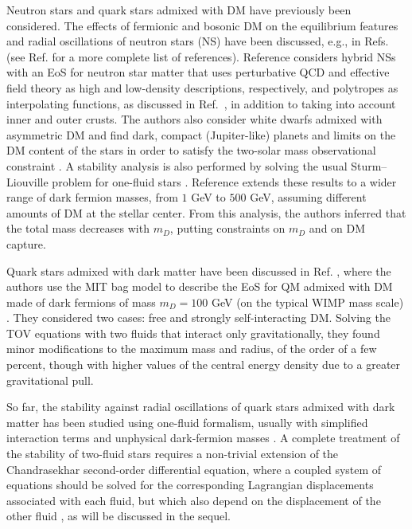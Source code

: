 \documentclass[universe,article,accept,moreauthors,pdftex]{Definitions/mdpi}
\begin{document}
Neutron stars and quark stars admixed with DM have  previously been considered. The effects of fermionic and bosonic DM on the equilibrium features and radial oscillations of neutron stars (NS) have been discussed, e.g., in Refs. \cite{Ciarcelluti:2010ji,Leung:2011zz,Leung:2012vea,Li:2012ii,Xiang:2013xwa,Ellis:2018bkr,Karkevandi:2021ygv} (see Ref. \cite{DelPopolo:2020hel} for a more complete list of references). Reference \cite{Tolos:2015qra} considers hybrid NSs with an EoS for neutron star matter that uses perturbative QCD and effective field theory as high and low-density descriptions, respectively, and polytropes as interpolating functions, as discussed in Ref.~\cite{Kurkela:2014vha}, in addition to taking into account inner and outer crusts. The authors also consider white dwarfs admixed with asymmetric DM and find dark, compact (Jupiter-like) planets and limits on the DM content of the stars in order to satisfy the two-solar mass observational constraint \cite{Demorest:2010bx,Antoniadis:2013pzd}. A stability analysis is also performed by solving the usual Sturm--Liouville problem for one-fluid stars \citep{Chandrasekhar:1964zza,Shapiro:1983du}. Reference \cite{Deliyergiyev:2019vti} extends these results to a wider range of dark fermion masses, from $1$ GeV to $500$ GeV,  assuming different amounts of DM at the stellar center. From this analysis, the authors inferred that the total mass decreases with $m_D$, putting constraints on $m_D$ and on DM capture. 

Quark stars admixed with dark matter have been discussed in Ref. \cite{Mukhopadhyay:2015xhs}, where the authors use the MIT bag model to describe the EoS for QM admixed with DM made of dark fermions of mass $m_D=100$ GeV (on the typical WIMP mass scale) %
. They considered two cases: free and strongly self-interacting DM. Solving the TOV equations with two fluids that interact only gravitationally, they found minor modifications to the maximum mass and radius, of the order of a few percent, though with higher values of the central energy density due to a greater gravitational pull. 

So far, the stability against radial oscillations of quark stars admixed with dark matter has been studied using one-fluid formalism, usually with simplified interaction terms and unphysical dark-fermion masses  \cite{Panotopoulos:2017eig,Panotopoulos:2018ipq}. A complete treatment of the stability of two-fluid stars requires a non-trivial extension of the Chandrasekhar second-order differential equation, where a coupled system of equations should be solved for the corresponding Lagrangian displacements associated with each fluid, but which also depend on the displacement of the other  fluid %
\cite{Leung:2011zz,Leung:2012vea,Kain:2020zjs,Kain:2021hpk}, as will be discussed in the sequel.
\end{document}
